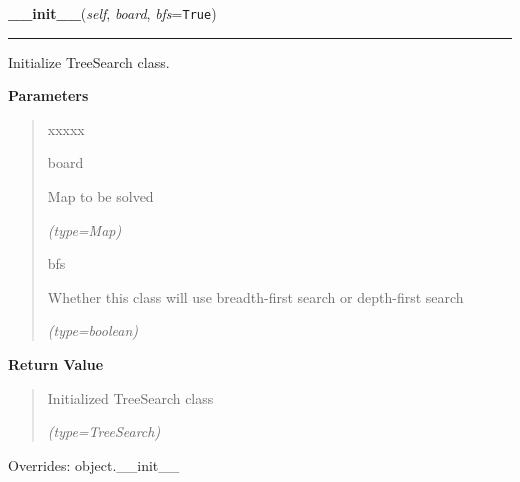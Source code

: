 \hspace{.8\funcindent}\begin{boxedminipage}{\funcwidth}

    \raggedright \textbf{\_\_init\_\_}(\textit{self}, \textit{board}, \textit{bfs}={\tt True})

    \vspace{-1.5ex}

    \rule{\textwidth}{0.5\fboxrule}
\setlength{\parskip}{2ex}
    Initialize TreeSearch class.

\setlength{\parskip}{1ex}
      \textbf{Parameters}
      \vspace{-1ex}

      \begin{quote}
        \begin{Ventry}{xxxxx}

          \item[board]

          Map to be solved

            {\it (type=Map)}

          \item[bfs]

          Whether this class will use breadth-first search or depth-first 
          search

            {\it (type=boolean)}

        \end{Ventry}

      \end{quote}

      \textbf{Return Value}
    \vspace{-1ex}

      \begin{quote}
      Initialized TreeSearch class

      {\it (type=TreeSearch)}

      \end{quote}

      Overrides: object.\_\_init\_\_

    \end{boxedminipage}

    \label{UnBlockMe:PathFinder:TreeSearch:TreeSearch:populateQueue}

